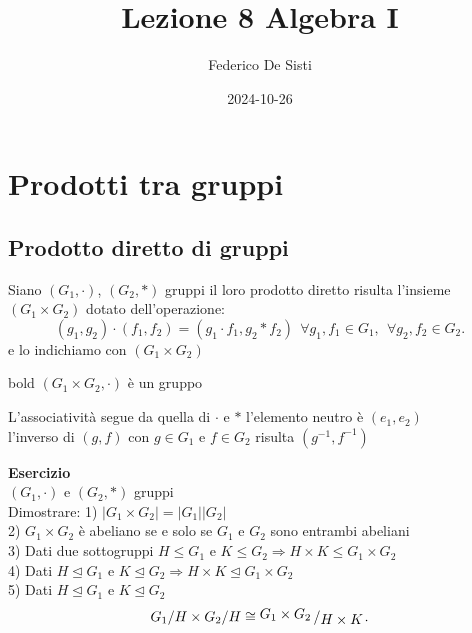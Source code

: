 \documentclass[12px]{article}
\title{Lezione 8 Algebra I}
\date{2024-10-26}
\author{Federico De Sisti}
\begin{document}
	\maketitle
	\newpage
	\section{Prodotti tra gruppi}
	\subsection{Prodotto diretto di gruppi}
	\begin{defi}
		Siano $(G_1,\cdot)$, $(G_2, *)$ gruppi il loro prodotto diretto risulta l'insieme $(G_1\times G_2)$ dotato dell'operazione:
		\[
			(g_1,g_2)\cdot(f_1,f_2) = (g_1\cdot f_1, g_2 * f_2) \ \ \forall g_1,f_1\in G_1, \ \ \forall g_2,f_2\in G_2
		.\]
		e lo indichiamo con $(G_1\times G_2)$
	\end{defi}
	\begin{prop}bold
		$(G_1\times G_2, \cdot)$ è un gruppo
	\end{prop}
	\begin{dimo}
		L'associatività segue da quella di $\cdot$ e  $*$ l'elemento neutro è  $(e_1,e_2)$\\
		l'inverso di $(g,f)$ con  $g\in G_1$ e $f\in G_2$ risulta $(g^{-1},f^{-1})$
	\end{dimo}
	\textbf{Esercizio}\\
	$(G_1, \cdot)$ e  $(G_2,*)$ gruppi\\
	Dimostrare:
	1) $|G_1\times G_2| = |G_1||G_2|$\\
	2) $G_1\times G_2$ è abeliano se e solo se $G_1$ e $G_2$ sono entrambi abeliani\\
	3) Dati due sottogruppi $H\leq G_1$ e $K\leq G_2 \Rightarrow H\times K\leq G_1\times G_2$ \\
	4) Dati $H\trianglelefteq G_1$ e $K\trianglelefteq G_2 \Rightarrow H\times K \trianglelefteq G_1\times G_2$ \\
	5) Dati  $H\trianglelefteq G_1$ e $K\trianglelefteq G_2$\\
	\[
		G_1/H \times G_2/H \cong \bigslant{G_1\times G_2}{H\times K}
	.\] 
\end{document}
